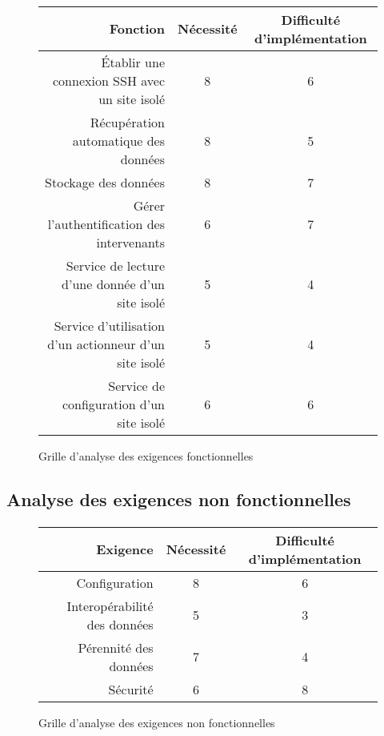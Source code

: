 \documentclass[a4paper, 11pt, final]{article}
\begin{document}
\paragraph{}
\begin{figure}[h!]
\begin{center}
\begin{tabular}{|r|c|c|}
\hline
Fonction & Nécessité & Difficulté d'implémentation\\ \hline \hline
Établir une connexion SSH avec un site isolé & 8 & 6\\ \hline
Récupération automatique des données & 8 & 5\\ \hline
Stockage des données & 8 & 7\\ \hline
Gérer l'authentification des intervenants & 6 & 7\\ \hline
Service de lecture d'une donnée d'un site isolé & 5 & 4\\ \hline
Service d'utilisation d'un actionneur d'un site isolé & 5 & 4\\ \hline
Service de configuration d'un site isolé & 6 & 6\\ \hline
\end{tabular}
\end{center}
\caption{Grille d'analyse des exigences fonctionnelles}
\end{figure}
\FloatBarrier

\subsection{Analyse des exigences non fonctionnelles}
\paragraph{}
\begin{figure}[h!]
\begin{center}
\begin{tabular}{|r|c|c|}
\hline
Exigence & Nécessité & Difficulté d'implémentation\\ \hline \hline
Configuration & 8 & 6\\ \hline
Interopérabilité des données & 5 & 3\\ \hline
Pérennité des données & 7 & 4\\ \hline
Sécurité & 6 & 8\\ \hline
\end{tabular}
\end{center}
\caption{Grille d'analyse des exigences non fonctionnelles}
\end{figure}
\FloatBarrier
\end{document}
